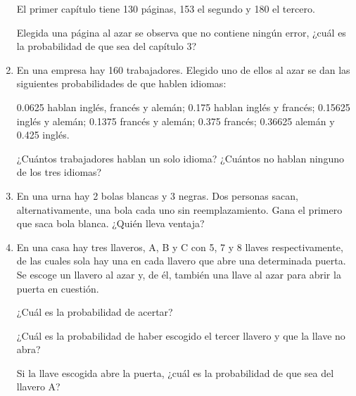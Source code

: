 \begin{adjustwidth}{5mm}{5mm}
\begin{enumerate}[PB. 1. ]
El primer capítulo tiene 130 páginas, 153 el segundo y 180 el tercero.

Elegida una página al azar se observa que no contiene ningún error, ¿cuál es la probabilidad de que sea del capítulo 3?

\hspace{-1cm}\vspace{1cm}


\item En una empresa hay 160 trabajadores. Elegido uno de ellos al azar se dan las siguientes probabilidades de que hablen idiomas:

0.0625 hablan inglés, francés y alemán; 0.175 hablan inglés y francés; 0.15625 inglés y alemán; 0.1375 francés y alemán;  0.375 francés;  0.36625 alemán y 0.425 inglés.

¿Cuántos trabajadores hablan un solo idioma? ¿Cuántos no hablan ninguno de los tres idiomas?

\hspace{-1cm}\vspace{1cm} 

\item En una urna hay 2 bolas blancas y 3 negras. Dos personas sacan, alternativamente, una bola cada uno sin reemplazamiento. Gana el primero que saca bola blanca. ¿Quién lleva ventaja?

\hspace{-1cm}\vspace{1cm}


\item En una casa hay tres llaveros, A, B y C con 5, 7 y 8 llaves respectivamente, de las cuales sola hay una en cada llavero que abre una determinada puerta. Se escoge un llavero al azar y, de él, también una llave al azar para abrir la puerta en cuestión.

¿Cuál es la probabilidad de acertar?

¿Cuál es la probabilidad de haber escogido el tercer llavero y que la llave no abra?

Si la llave escogida abre la puerta, ¿cuál es la probabilidad de que sea del llavero A?

\hspace{-1cm}\vspace{1cm}





\end{enumerate}
\end{adjustwidth}
